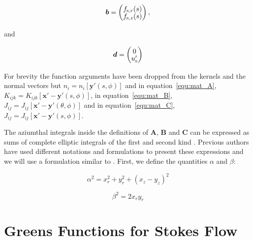 \documentclass[12pt]{article}
\begin{document}
\begin{equation}
\setlength{\arraycolsep}{5pt}
\renewcommand{\arraystretch}{1.3}
\boldsymbol{b} = \left( \begin{matrix}
f_{\text{s},r}(s) \\[-5pt]
f_{\text{s},z}(s) \\
\end{matrix} \right)  ,
\label{equ:vec_b}
\end{equation}

and 

\begin{equation}
\setlength{\arraycolsep}{5pt}
\renewcommand{\arraystretch}{1.3}
\boldsymbol{d} = \left( \begin{matrix}
0 \\[-5pt]
u'_{\text{s}} \\
\end{matrix} \right) 
\label{equ:vec_d}
\end{equation}

For brevity the function arguments have been dropped from the kernels and the normal vectors but $n_{i} = n_{i}[\boldsymbol{y'}(s, \phi)]$ and in equation~\ref{equ:mat_A}, $K_{ijk} = K_{ijk}[\boldsymbol{x'} - \boldsymbol{y'}(s, \phi)]$, in equation~\ref{equ:mat_B}, $J_{ij} = J_{ij}[\boldsymbol{x'} - \boldsymbol{y'}(\theta, \phi)]$ and in equation~\ref{equ:mat_C}, $J_{ij} = J_{ij}[\boldsymbol{x'} - \boldsymbol{y'}(s, \phi)]$.

The aziumthal integrals inside the definitions of $\boldsymbol{A}$, $\boldsymbol{B}$ and $\boldsymbol{C}$ can be expressed as sums of complete elliptic integrals of the first and second kind \citep{Lee82, Geller86, Graziani89, Pozrikidis92, Manga94, Roumeliotis00}. Previous authors have used different notations and formulations to present these expressions and we will use a formulation similar to \citet{Graziani89}. First, we define the quantities $\alpha$ and $\beta$:

\begin{equation}
\label{equ:alpha_def}
\alpha^{2} = x_{r}^{2} + y_{r}^{2} + (x_{z} - y_{z})^{2}
\end{equation}

\begin{equation}
\label{equ:beta_def}
\beta^{2} = 2 x_{r} y_{r}
\end{equation}

\appendix

\section{Greens Functions for Stokes Flow}
\label{app:Greens}
\end{document}
